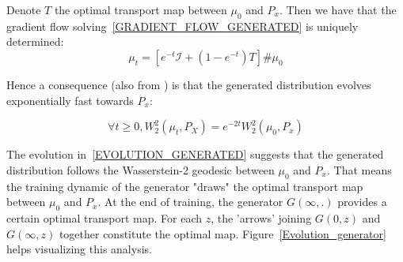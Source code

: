 \documentclass[runningheads]{llncs}
\newcommand\mycitet[1]{\cite{#1}}
\newcommand{\id}{\mathcal{I}}
\begin{document}
\begin{theorem}
Denote $T$ the optimal transport map between $\mu_0$ and $P_x$. Then we have that the gradient flow solving~\eqref{GRADIENT_FLOW_GENERATED} is uniquely determined:
\begin{equation}
\mu_t= [e^{-t}\id + (1-e^{-t})T]\#\mu_0
\label{EVOLUTION_GENERATED}
\end{equation}
\end{theorem}
Hence a consequence (also from \mycitet{ambrosio2008gradient}) is that the generated distribution evolves exponentially fast towards $P_x$:
\begin{corollary}
\begin{equation}
     \forall t\geqslant 0, W_2^2(\mu_t,P_X)=e^{-2t}W_2^2(\mu_0,P_x)
    \label{FAST_CONVERGENCE}
\end{equation}
\end{corollary}
The evolution in~\eqref{EVOLUTION_GENERATED} suggests that the generated distribution follows the Wasserstein-2 geodesic between $\mu_0$ and $P_x$. That means the training dynamic of the generator "draws" the optimal transport map between $\mu_0$ and $P_x$. At the end of training, the generator $G(\infty,.)$ provides a certain optimal transport map. For each $z$, the 'arrows' joining $G(0,z)$ and $G(\infty,z)$ together constitute the optimal map. Figure~\ref{Evolution_generator} helps visualizing this analysis.
 
\end{document}
